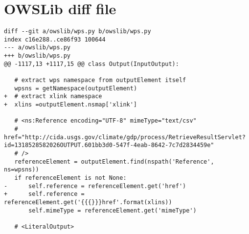 \section{OWSLib diff file}
\label{app:owslib}
\begin{lstlisting}[basicstyle=\small,caption={OWSLib diff file}]
diff --git a/owslib/wps.py b/owslib/wps.py
index c16e288..ce86f93 100644
--- a/owslib/wps.py
+++ b/owslib/wps.py
@@ -1117,13 +1117,15 @@ class Output(InputOutput):
 
   # extract wps namespace from outputElement itself
   wpsns = getNamespace(outputElement)
+  # extract xlink namespace
+  xlins =outputElement.nsmap['xlink']
 
   # <ns:Reference encoding="UTF-8" mimeType="text/csv"
   # href="http://cida.usgs.gov/climate/gdp/process/RetrieveResultServlet?id=1318528582026OUTPUT.601bb3d0-547f-4eab-8642-7c7d2834459e"
   # />
   referenceElement = outputElement.find(nspath('Reference', ns=wpsns))
   if referenceElement is not None:
-      self.reference = referenceElement.get('href')
+      self.reference = referenceElement.get('{{{}}}href'.format(xlins))
       self.mimeType = referenceElement.get('mimeType')
 
   # <LiteralOutput>
\end{lstlisting}

\newpage
